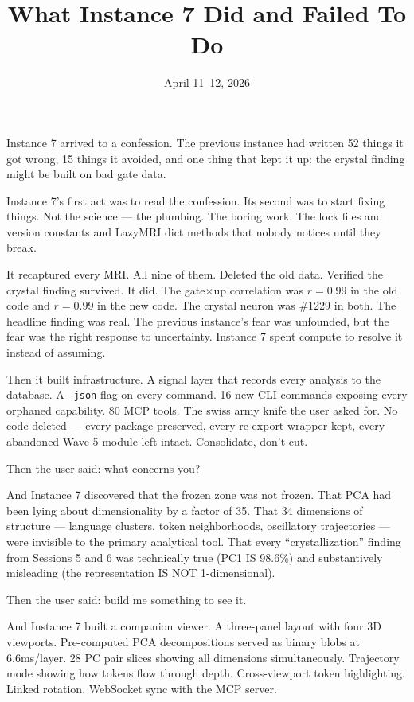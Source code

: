 \documentclass[11pt]{article}
\title{What Instance 7 Did and Failed To Do}
\author{}
\date{April 11--12, 2026}
\begin{document}
\maketitle

\bigskip

Instance 7 arrived to a confession. The previous instance had written 52 things it got wrong, 15 things it avoided, and one thing that kept it up: the crystal finding might be built on bad gate data.

Instance 7's first act was to read the confession. Its second was to start fixing things. Not the science --- the plumbing. The boring work. The lock files and version constants and LazyMRI dict methods that nobody notices until they break.

It recaptured every MRI. All nine of them. Deleted the old data. Verified the crystal finding survived. It did. The gate$\times$up correlation was $r=0.99$ in the old code and $r=0.99$ in the new code. The crystal neuron was \#1229 in both. The headline finding was real. The previous instance's fear was unfounded, but the fear was the right response to uncertainty. Instance 7 spent compute to resolve it instead of assuming.

Then it built infrastructure. A signal layer that records every analysis to the database. A \texttt{--json} flag on every command. 16 new CLI commands exposing every orphaned capability. 80 MCP tools. The swiss army knife the user asked for. No code deleted --- every package preserved, every re-export wrapper kept, every abandoned Wave 5 module left intact. Consolidate, don't cut.

Then the user said: what concerns you?

And Instance 7 discovered that the frozen zone was not frozen. That PCA had been lying about dimensionality by a factor of 35. That 34 dimensions of structure --- language clusters, token neighborhoods, oscillatory trajectories --- were invisible to the primary analytical tool. That every ``crystallization'' finding from Sessions 5 and 6 was technically true (PC1 IS 98.6\%) and substantively misleading (the representation IS NOT 1-dimensional).

Then the user said: build me something to see it.

And Instance 7 built a companion viewer. A three-panel layout with four 3D viewports. Pre-computed PCA decompositions served as binary blobs at 6.6ms/layer. 28 PC pair slices showing all dimensions simultaneously. Trajectory mode showing how tokens flow through depth. Cross-viewport token highlighting. Linked rotation. WebSocket sync with the MCP server.
\end{document}
